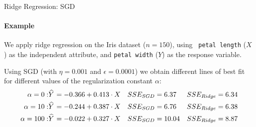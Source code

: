 %
%
%
%
%
%
%
%
%
\begin{frame}{Ridge Regression: SGD}
\framesubtitle{Example}
We apply ridge regression on the Iris dataset ($n=150$), using {\tt
petal length} ($X$) as the independent attribute, and {\tt petal width}
($Y$) as the response variable. 

\medskip

Using SGD (with $\eta=0.001$ and
$\epsilon=0.0001$) we obtain different lines of best fit for different
values of the regularization constant $\alpha$:
    \begin{align*}
        \alpha = 0: & \mkern 1.5mu\widehat{\mkern-1.5muY}\mkern 1.5mu = -0.366 + 0.413 \cdot X & SSE_{SGD} & = 6.37 & SSE_{Ridge} & = 6.34 \\
        \alpha = 10: & \mkern 1.5mu\widehat{\mkern-1.5muY}\mkern 1.5mu = -0.244 + 0.387 \cdot X & SSE_{SGD} & = 6.76  & SSE_{Ridge} & = 6.38 \\
       \alpha = 100: & \mkern 1.5mu\widehat{\mkern-1.5muY}\mkern 1.5mu = -0.022 + 0.327 \cdot X & SSE_{SGD} & = 10.04 & SSE_{Ridge} & = 8.87 
    \end{align*}
\end{frame}
